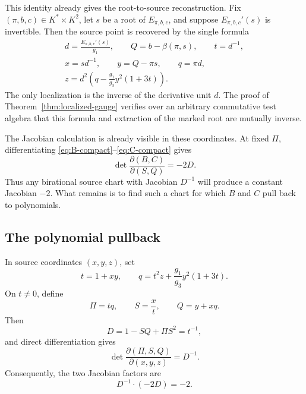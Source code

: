 This identity already gives the root-to-source reconstruction.  Fix
\((\pi,b,c)\in K^*\times K^2\), let \(s\) be a root of
\(E_{\pi,b,c}\), and suppose \(E_{\pi,b,c}'(s)\) is invertible.  Then the
source point is recovered by the single formula
\begin{equation}
\boxed{
\begin{gathered}
 d=\frac{E_{\pi,b,c}'(s)}{g_1},\qquad
 Q=b-\beta(\pi,s),\qquad t=d^{-1},\\
 x=sd^{-1},\qquad y=Q-\pi s,\qquad q=\pi d,\\
 z=d^2\left(q-\frac{g_1}{g_3}y^2(1+3t)\right).
\end{gathered}}
\label{eq:boxed-root-reconstruction}
\end{equation}
The only localization is the inverse of the derivative unit \(d\).  The
proof of Theorem~\ref{thm:localized-gauge} verifies over an arbitrary
commutative test algebra that this formula and extraction of the marked root
are mutually inverse.

The Jacobian calculation is already visible in these coordinates.  At fixed
\(\Pi\), differentiating \eqref{eq:B-compact}--\eqref{eq:C-compact} gives
\begin{equation}
 \det\frac{\partial(B,C)}{\partial(S,Q)}=-2D.
 \label{eq:plane-jacobian}
\end{equation}
Thus any birational source chart with Jacobian \(D^{-1}\) will produce a
constant Jacobian \(-2\).  What remains is to find such a chart for which
\(B\) and \(C\) pull back to polynomials.

\subsection{The polynomial pullback}

In source coordinates \((x,y,z)\), set
\begin{equation}
 t=1+xy,
 \qquad
 q=t^2z+\frac{g_1}{g_3}y^2(1+3t).
 \label{eq:tq}
\end{equation}
On \(t\neq0\), define
\begin{equation}
 \Pi=tq,\qquad S=\frac{x}{t},\qquad Q=y+xq.
 \label{eq:source-chart}
\end{equation}
Then
\[
 D=1-SQ+\Pi S^2=t^{-1},
\]
and direct differentiation gives
\begin{equation}
 \det\frac{\partial(\Pi,S,Q)}{\partial(x,y,z)}=D^{-1}.
 \label{eq:source-chart-jacobian}
\end{equation}
Consequently, the two Jacobian factors are
\[
 D^{-1}\cdot(-2D)=-2.
\]

